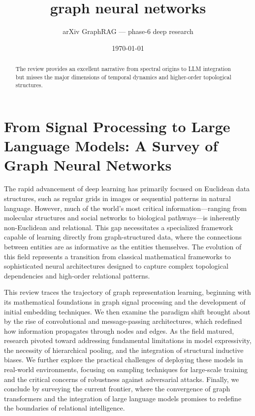 \documentclass[11pt]{article}
\title{graph neural networks}
\author{arXiv GraphRAG --- phase-6 deep research}
\date{\today}
\begin{document}
\maketitle

\begin{abstract}
The review provides an excellent narrative from spectral origins to LLM integration but misses the major dimensions of temporal dynamics and higher-order topological structures.
\end{abstract}

\section{From Signal Processing to Large Language Models: A Survey of Graph Neural Networks}

The rapid advancement of deep learning has primarily focused on Euclidean data structures, such as regular grids in images or sequential patterns in natural language. However, much of the world's most critical information—ranging from molecular structures and social networks to biological pathways—is inherently non-Euclidean and relational. This gap necessitates a specialized framework capable of learning directly from graph-structured data, where the connections between entities are as informative as the entities themselves. The evolution of this field represents a transition from classical mathematical frameworks to sophisticated neural architectures designed to capture complex topological dependencies and high-order relational patterns.

This review traces the trajectory of graph representation learning, beginning with its mathematical foundations in graph signal processing and the development of initial embedding techniques. We then examine the paradigm shift brought about by the rise of convolutional and message-passing architectures, which redefined how information propagates through nodes and edges. As the field matured, research pivoted toward addressing fundamental limitations in model expressivity, the necessity of hierarchical pooling, and the integration of structural inductive biases. We further explore the practical challenges of deploying these models in real-world environments, focusing on sampling techniques for large-scale training and the critical concerns of robustness against adversarial attacks. Finally, we conclude by surveying the current frontier, where the convergence of graph transformers and the integration of large language models promises to redefine the boundaries of relational intelligence.
\end{document}
